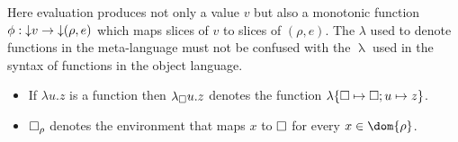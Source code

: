 

Here evaluation produces not only a value $v$ but also a monotonic function $\phi: {\downarrow}{v} \to {\downarrow}{(\rho,e)}$ which maps slices of $v$ to slices of $(\rho,e)$. The $\lambda$ used to denote functions in the meta-language must not be confused with the $\uplambda$ used in the syntax of functions in the object language.

\begin{itemize}
\item If $\lambda u.z$ is a function then $\lambda_{\square} u.z$ denotes the function $\lambda\{\square \mapsto \square; u \mapsto z\}$.
\item $\square_\rho$ denotes the environment that maps $x$ to $\square$ for every $x \in \dom{\rho}$.
\end{itemize}


